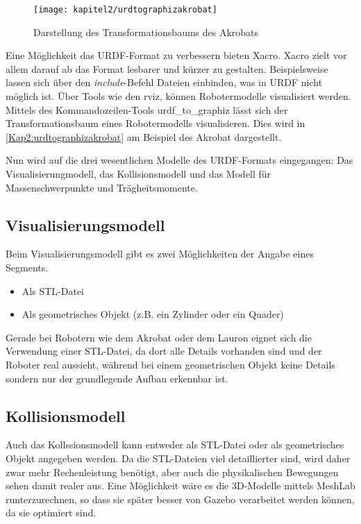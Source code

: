 \begin{figure}[b!]
  \centering
  \texttt{[image: kapitel2/urdtographizakrobat]}
  \caption{Darstellung des Transformationsbaums des Akrobats}
  \label{Kap2:urdtographizakrobat}
\end{figure}

Eine Möglichkeit das \ac{URDF}-Format zu verbessern bieten \ac{Xacro}. \ac{Xacro} zielt vor allem darauf ab das Format lesbarer und kürzer zu gestalten. Beispielsweise lassen sich über den \emph{include}-Befehl Dateien einbinden, was in \ac{URDF} nicht möglich ist. Über Tools wie den rviz, können Robotermodelle visualisiert werden. Mittels des Kommandozeilen-Tools urdf\_to\_graphiz lässt sich der Transformationsbaum eines Robotermodells visualisieren. Dies wird in \autoref{Kap2:urdtographizakrobat} am Beispiel des Akrobat dargestellt.

Nun wird auf die drei wesentlichen Modelle des \ac{URDF}-Formats eingegangen: Das Visualisierungmodell, das Kollisionsmodell und das Modell für Massenschwerpunkte und Trägheitsmomente.

\subsection{Visualisierungsmodell}

Beim Visualisierungsmodell gibt es zwei Möglichkeiten der Angabe eines Segments.
\begin{itemize}
\item Als \ac{STL}-Datei
\item Als geometrisches Objekt (z.B. ein Zylinder oder ein Quader)
\end{itemize}

Gerade bei Robotern wie dem Akrobat oder dem Lauron eignet sich die Verwendung einer \ac{STL}-Datei, da dort alle Details vorhanden sind und der Roboter real aussieht, während bei einem geometrischen Objekt keine Details sondern nur der grundlegende Aufbau erkennbar ist.

\subsection{Kollisionsmodell}

Auch das Kollssionsmodell kann entweder als \ac{STL}-Datei oder als geometrisches Objekt angegeben werden. Da die \ac{STL}-Dateien viel detaillierter sind, wird daher zwar mehr Rechenleistung benötigt, aber auch die physikalischen Bewegungen sehen damit realer aus. Eine Möglichkeit wäre es die 3D-Modelle mittels MeshLab \autocite{LocalChapterEvents:ItalChap:ItalianChapConf2008:129-136} runterzurechnen, so dass sie später besser von Gazebo verarbeitet werden können, da sie optimiert sind.

